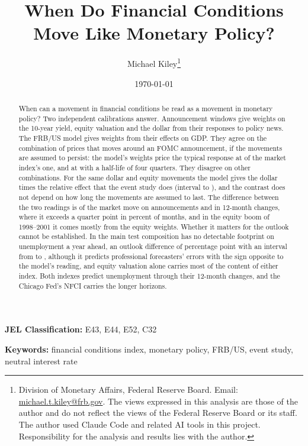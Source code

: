 \documentclass[11pt]{article}
\title{When Do Financial Conditions Move Like Monetary Policy?}
\author{Michael Kiley\thanks{Division of Monetary Affairs, Federal Reserve Board. Email: \href{mailto:michael.t.kiley@frb.gov}{michael.t.kiley@frb.gov}. The views expressed in this analysis are those of the author and do not reflect the views of the Federal Reserve Board or its staff. The author used Claude Code and related AI tools in this project. Responsibility for the analysis and results lies with the author.}}
\date{\today}
\begin{document}
\maketitle

\begin{abstract}
When can a movement in financial conditions be read as a movement in monetary policy? Two independent calibrations answer. Announcement windows give weights on the 10-year yield, equity valuation and the dollar from their responses to policy news. The FRB/US model gives weights from their effects on GDP. They agree on the combination of prices that moves around an FOMC announcement, if the movements are assumed to persist: the model's weights price the typical response at  of the market index's one, and at  with a half-life of four quarters. They disagree on other combinations. For the same dollar and equity movements the model gives the dollar  times the relative effect that the event study does (interval  to ), and the contrast does not depend on how long the movements are assumed to last. The difference between the two readings is  of the market move on announcements and  in 12-month changes, where it exceeds a quarter point in  percent of months, and in the equity boom of 1998--2001 it comes mostly from the equity weights. Whether it matters for the outlook cannot be established. In the main test composition has no detectable footprint on unemployment a year ahead, an outlook difference of  percentage point with an interval from  to , although it predicts professional forecasters' errors with the sign opposite to the model's reading, and equity valuation alone carries most of the content of either index. Both indexes predict unemployment through their 12-month changes, and the Chicago Fed's NFCI carries the longer horizons.
\end{abstract}

\noindent\textbf{JEL Classification:} E43, E44, E52, C32

\noindent\textbf{Keywords:} financial conditions index, monetary policy, FRB/US, event study, neutral interest rate

\pagestyle{plain}

\newpage
{}

\end{document}

